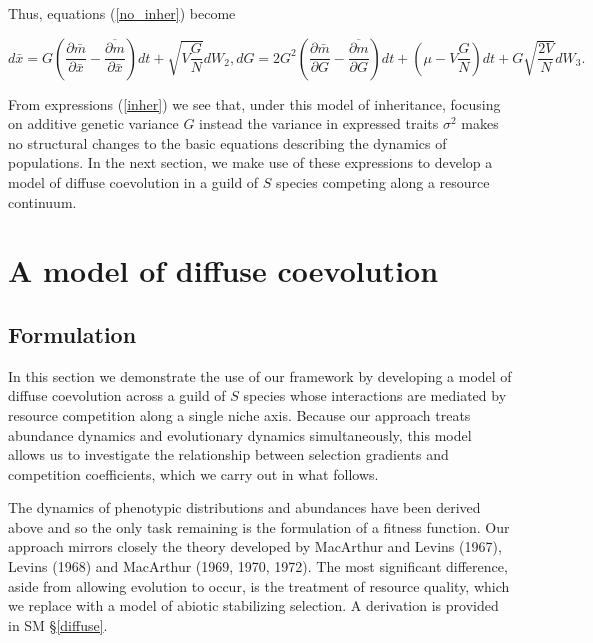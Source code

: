 \documentclass[]{article}
\begin{document}
Thus, equations (\ref{no_inher}) become

\begin{subequations}\label{inher}
\begin{equation}\label{xbarfinal}
d\bar x=G\left(\frac{\partial\bar m}{\partial\bar x}-\overline{\frac{\partial m}{\partial\bar x}}\right)dt+\sqrt{V\frac{G}{N}}dW_2,
\end{equation}
\begin{equation}\label{Gfinal}
dG=2G^2\left(\frac{\partial\bar m}{\partial G}-\overline{\frac{\partial m}{\partial G}}\right)dt+\left(\mu-V\frac{G}{N}\right)dt+ G\sqrt{\frac{2V}{N}}dW_3.
\end{equation}
\end{subequations}

From expressions (\ref{inher}) we see that, under this model of
inheritance, focusing on additive genetic variance \(G\) instead the
variance in expressed traits \(\sigma^2\) makes no structural changes to
the basic equations describing the dynamics of populations. In the next
section, we make use of these expressions to develop a model of diffuse
coevolution in a guild of \(S\) species competing along a resource
continuum.

\hypertarget{a-model-of-diffuse-coevolution}{%
\section{\texorpdfstring{A model of diffuse coevolution
\label{coev}}{A model of diffuse coevolution }}\label{a-model-of-diffuse-coevolution}}

\hypertarget{formulation}{%
\subsection{\texorpdfstring{Formulation
\label{form_coev}}{Formulation }}\label{formulation}}

In this section we demonstrate the use of our framework by developing a
model of diffuse coevolution across a guild of \(S\) species whose
interactions are mediated by resource competition along a single niche
axis. Because our approach treats abundance dynamics and evolutionary
dynamics simultaneously, this model allows us to investigate the
relationship between selection gradients and competition coefficients,
which we carry out in what follows.

The dynamics of phenotypic distributions and abundances have been
derived above and so the only task remaining is the formulation of a
fitness function. Our approach mirrors closely the theory developed by
MacArthur and Levins (1967), Levins (1968) and MacArthur (1969, 1970,
1972). The most significant difference, aside from allowing evolution to
occur, is the treatment of resource quality, which we replace with a
model of abiotic stabilizing selection. A derivation is provided in SM
\S\ref{diffuse}.
\end{document}
